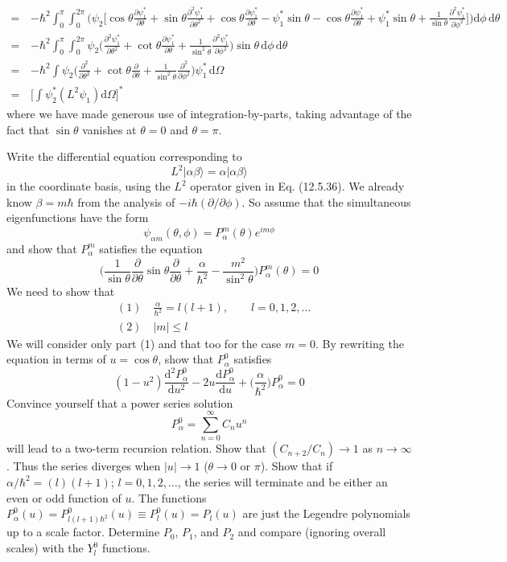 \documentclass[../principles-of-quantum-mechanics.tex]{subfiles}
\begin{document}
\begin{questions}
\begin{solution}
\begin{align*}
				=\,&{-\hbar^2}\int_0^{\pi}\int_0^{2\pi}\Big(\psi_2\Big[\cos\theta\frac{\partial\psi_1^*}{\partial\theta} + \sin\theta\frac{\partial^2\psi_1^*}{\partial\theta^2} + \cos\theta\frac{\partial\psi_1^*}{\partial\theta} - \psi_1^*\sin\theta - \cos\theta\frac{\partial\psi_1^*}{\partial\theta} + \psi_1^*\sin\theta + \frac{1}{\sin\theta}\frac{\partial^2\psi_1^*}{\partial\phi^2}\Big]\Big)\mathrm{d}\phi\,\mathrm{d}\theta \\
				=\,&{-\hbar^2}\int_0^{\pi}\int_0^{2\pi}\psi_2\Big(\frac{\partial^2\psi_1^*}{\partial\theta^2} + \cot\theta\frac{\partial\psi_1^*}{\partial\theta} + \frac{1}{\sin^2\theta}\frac{\partial^2\psi_1^*}{\partial\phi^2}\Big)\sin\theta\,\mathrm{d}\phi\,\mathrm{d}\theta \\
				=\,&{-\hbar^2}\int\psi_2\Big(\frac{\partial^2}{\partial\theta^2} + \cot\theta\frac{\partial}{\partial\theta} + \frac{1}{\sin^2\theta}\frac{\partial^2}{\partial\phi^2}\Big)\psi_1^*\,\mathrm{d}\Omega \\
				=\,&\Big[\int\psi_2^*(L^2\psi_1)\mathrm{d}\Omega\Big]^*
			\end{align*}
			where we have made generous use of integration-by-parts, taking advantage of the fact that $\sin\theta$ vanishes at $\theta = 0$ and $\theta = \pi$.
		\end{solution}
	
		\question Write the differential equation corresponding to
		$$L^2|\alpha\beta\rangle = \alpha|\alpha\beta\rangle$$
		in the coordinate basis, using the $L^2$ operator given in Eq. (12.5.36). We already know $\beta=m\hbar$ from the analysis of $-i\hbar(\partial/\partial\phi)$. So assume that the simultaneous eigenfunctions have the form
		$$\psi_{\alpha m}(\theta, \phi) = P_{\alpha}^m(\theta)e^{im\phi}$$
		and show that $P_{\alpha}^m$ satisfies the equation
		$$\Big(\frac{1}{\sin\theta}\frac{\partial}{\partial\theta}\sin\theta\frac{\partial}{\partial\theta} + \frac{\alpha}{\hbar^2} - \frac{m^2}{\sin^2\theta}\Big)P_{\alpha}^m(\theta) = 0$$
		We need to show that
		\begin{align*}
			&(1)\quad\frac{\alpha}{\hbar^2} = l(l + 1), \qquad l = 0, 1, 2, \dots \\
			&(2)\quad|m| \leq l
		\end{align*}
		We will consider only part (1) and that too for the case $m = 0$. By rewriting the equation in terms of $u=\cos\theta$, show that $P_{\alpha}^0$ satisfies
		$$(1 - u^2)\frac{\mathrm{d}^2P_{\alpha}^0}{\mathrm{d}u^2} - 2u\frac{\mathrm{d}P_{\alpha}^0}{\mathrm{d}u} + \Big(\frac{\alpha}{\hbar^2}\Big)P_{\alpha}^0 = 0$$
		Convince yourself that a power series solution
		$$P_{\alpha}^0 = \sum_{n=0}^{\infty}C_nu^n$$
		will lead to a two-term recursion relation. Show that $(C_{n+2}/C_n)\to 1$ as $n \to \infty$. Thus the series diverges when $|u|\to 1$ ($\theta\to 0$ or $\pi$). Show that if $\alpha/\hbar^2 = (l)(l + 1)$; $l = 0, 1, 2, \dots$, the series will terminate and be either an even or odd function of $u$. The functions $P_{\alpha}^0(u) = P_{l(l+1)\hbar^2}^0(u) \equiv P_{l}^0(u) = P_l(u)$ are just the Legendre polynomials up to a scale factor. Determine $P_0$, $P_1$, and $P_2$ and compare (ignoring overall scales) with the $Y_l^0$ functions.
		

\end{questions}
\end{document}
